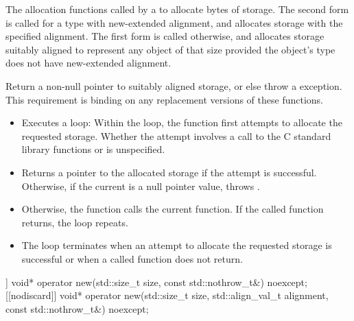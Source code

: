 \begin{itemdescr}
\pnum
\effects
The
allocation functions
called by a
to allocate
 bytes of storage.
The second form is called for a type with new-extended alignment,
and allocates storage
with the specified alignment.
The first form is called otherwise,
and allocates storage
suitably aligned to represent any object of that size
provided the object's type does not have new-extended alignment.

\pnum
\replaceable
{}

\pnum
\required
Return a non-null pointer to suitably aligned storage,
or else throw a
%
exception.
This requirement is binding on any replacement versions of these functions.

\pnum
{}

\begin{itemize}
\item
Executes a loop:
Within the loop, the function first attempts to allocate the requested storage.
Whether the attempt involves a call to the C standard library functions
 or 
is unspecified.
%
\item
Returns a pointer to the allocated storage if the attempt is successful.
Otherwise, if the
current  is
a null pointer value, throws
.
\item
Otherwise, the function calls the current
 function.
If the called function returns, the loop repeats.
\item
The loop terminates when an attempt to allocate the requested storage is
successful or when a called
function does not return.
\end{itemize}
\end{itemdescr}

%
\begin{itemdecl}
[[nodiscard]] void* operator new(std::size_t size, const std::nothrow_t&) noexcept;
[[nodiscard]] void* operator new(std::size_t size, std::align_val_t alignment,
                                 const std::nothrow_t&) noexcept;
\end{itemdecl}


